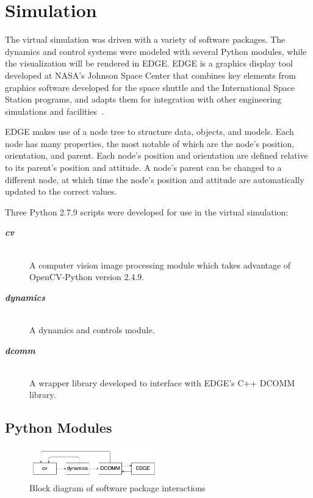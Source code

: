 \documentclass[journal, 10pt]{IEEEtran}
\begin{document}
\section{Simulation}

The virtual simulation was driven with a variety of software packages. The dynamics and control systems were modeled with several Python modules, while the visualization will be rendered in EDGE. EDGE is a graphics display tool developed at NASA's Johnson Space Center that combines key elements from graphics software developed for the space shuttle and the International Space Station programs, and adapts them for integration with other engineering simulations and facilities~\cite{EDGE}.

EDGE makes use of a node tree to structure data, objects, and models. Each node has many properties, the most notable of which are the node's position, orientation, and parent. Each node's position and orientation are defined relative to its parent's position and attitude. A node's parent can be changed to a different node, at which time the node's position and attitude are automatically updated to the correct values.

Three Python 2.7.9 scripts were developed for use in the virtual simulation:
\begin{description}
    \item[\textbf{\textit{cv}}] \hfill \\
    A computer vision image processing module which takes advantage of OpenCV-Python version 2.4.9.
    \item[\textbf{\textit{dynamics}}] \hfill \\
    A dynamics and controls module.
    \item[\textbf{\textit{dcomm}}] \hfill \\
    A wrapper library developed to interface with EDGE's C++ DCOMM library.
\end{description}

\subsection{Python Modules}
\begin{figure}[b]
\begin{center}
\includegraphics[width=0.5\textwidth]{figures/block.pdf}
\caption{Block diagram of software package interactions}
\label{block_diagram}
\end{center}
\end{figure}
\end{document}

